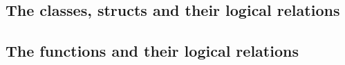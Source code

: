 \subsection{The classes, structs and their logical relations}

\subsection{The functions and their logical relations}
